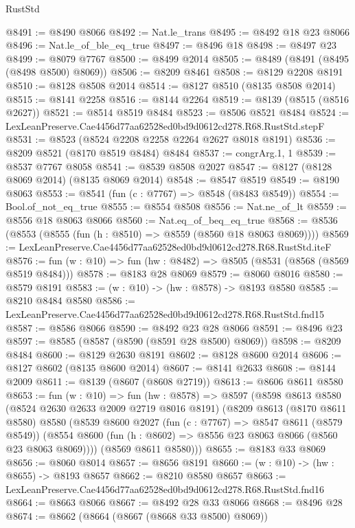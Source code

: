 \begin{lexlean}{RustStd}
\begin{coremodule}
@8491 := @8490 @8066
@8492 := Nat.le_trans
@8495 := @8492 @18 @23 @8066
@8496 := Nat.le_of_ble_eq_true
@8497 := @8496 @18
@8498 := @8497 @23
@8499 := @8079 @7767
@8500 := @8499 @2014
@8505 := @8489 (@8491 (@8495 (@8498 @8500) @8069))
@8506 := @8209 @8461
@8508 := @8129 @2208 @8191
@8510 := @8128 @8508 @2014
@8514 := @8127 @8510 (@8135 @8508 @2014)
@8515 := @8141 @2258
@8516 := @8144 @2264
@8519 := @8139 (@8515 (@8516 @2627))
@8521 := @8514 @8519 @8484
@8523 := @8506 @8521 @8484
@8524 := LexLeanPreserve.Cae4456d77aa62528ed0bd9d0612cd278.R68.RustStd.stepF
@8531 := @8523 (@8524 @2208 @2258 @2264 @2627 @8018 @8191)
@8536 := @8209 @8521 (@8170 @8519 @8484) @8484
@8537 := congrArg.{1, 1}
@8539 := @8537 @7767 @8058
@8541 := @8539 @8508 @2027
@8547 := @8127 (@8128 @8069 @2014) (@8135 @8069 @2014)
@8548 := @8547 @8519
@8549 := @8190 @8063
@8553 := @8541 (fun (c : @7767) => @8548 (@8483 @8549))
@8554 := Bool.of_not_eq_true
@8555 := @8554 @8508
@8556 := Nat.ne_of_lt
@8559 := @8556 @18 @8063 @8066
@8560 := Nat.eq_of_beq_eq_true
@8568 := @8536 (@8553 (@8555 (fun (h : @8510) => @8559 (@8560 @18 @8063 @8069))))
@8569 := LexLeanPreserve.Cae4456d77aa62528ed0bd9d0612cd278.R68.RustStd.iteF
@8576 := fun (w : @10) => fun (hw : @8482) => @8505 (@8531 (@8568 (@8569 @8519 @8484)))
@8578 := @8183 @28 @8069
@8579 := @8060 @8016
@8580 := @8579 @8191
@8583 := (w : @10) -> (hw : @8578) -> @8193 @8580
@8585 := @8210 @8484 @8580
@8586 := LexLeanPreserve.Cae4456d77aa62528ed0bd9d0612cd278.R68.RustStd.fnd15
@8587 := @8586 @8066
@8590 := @8492 @23 @28 @8066
@8591 := @8496 @23
@8597 := @8585 (@8587 (@8590 (@8591 @28 @8500) @8069))
@8598 := @8209 @8484
@8600 := @8129 @2630 @8191
@8602 := @8128 @8600 @2014
@8606 := @8127 @8602 (@8135 @8600 @2014)
@8607 := @8141 @2633
@8608 := @8144 @2009
@8611 := @8139 (@8607 (@8608 @2719))
@8613 := @8606 @8611 @8580
@8653 := fun (w : @10) =>
  fun (hw : @8578) =>
  @8597
    (@8598
      @8613
      @8580
      (@8524 @2630 @2633 @2009 @2719 @8016 @8191)
      (@8209
        @8613
        (@8170 @8611 @8580)
        @8580
        (@8539
          @8600
          @2027
          (fun (c : @7767) => @8547 @8611 (@8579 @8549))
          (@8554 @8600 (fun (h : @8602) => @8556 @23 @8063 @8066 (@8560 @23 @8063 @8069))))
        (@8569 @8611 @8580)))
@8655 := @8183 @33 @8069
@8656 := @8060 @8014
@8657 := @8656 @8191
@8660 := (w : @10) -> (hw : @8655) -> @8193 @8657
@8662 := @8210 @8580 @8657
@8663 := LexLeanPreserve.Cae4456d77aa62528ed0bd9d0612cd278.R68.RustStd.fnd16
@8664 := @8663 @8066
@8667 := @8492 @28 @33 @8066
@8668 := @8496 @28
@8674 := @8662 (@8664 (@8667 (@8668 @33 @8500) @8069))

\end{coremodule}
\end{lexlean}

